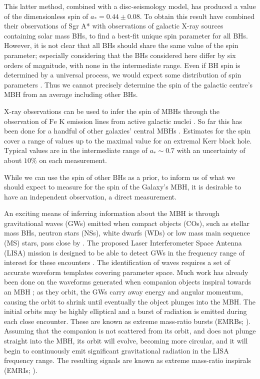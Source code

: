 \documentclass[useAMS,usedcolumn,usegraphicx,usenatbib]{mn2e}
\begin{document}
This latter method, combined with a disc-seismology model, has produced a value of the dimensionless spin of $a_\ast = 0.44 \pm 0.08$. To obtain this result \citet{Kato2010} have combined their observations of Sgr A* with observations of galactic X-ray sources containing solar mass BHs, to find a best-fit unique spin parameter for all BHs. However, it is not clear that all BHs should share the same value of the spin parameter; especially considering that the BHs considered here differ by six orders of magnitude, with none in the intermediate range. Even if BH spin is determined by a universal process, we would expect some distribution of spin parameters \citep{King2008, Berti2008}. Thus we cannot precisely determine the spin of the galactic centre's MBH from an average including other BHs.

X-ray observations can be used to infer the spin of MBHs through the observation of $\mathrm{Fe}$ $\mathrm{K}$ emission lines from active galactic nuclei \citep{Miller2007, McClintock2011}. So far this has been done for a handful of other galaxies' central MBHs \citep{Brenneman2006, Miniutti2009, Schmoll2009, delaCallePerez2010, Zoghbi2010, Nardini2011,  Patrick2011}. Estimates for the spin cover a range of values up to the maximal value for an extremal Kerr black hole. Typical values are in the intermediate range of $a_\ast \sim 0.7$ with an uncertainty of about $10\%$ on each measurement.

While we can use the spin of other BHs as a prior, to inform us of what we should expect to measure for the spin of the Galaxy's MBH, it is desirable to have an independent observation, a direct measurement.

An exciting means of inferring information about the MBH is through gravitational waves (GWs) emitted when compact objects (COs), such as stellar mass BHs, neutron stars (NSs), white dwarfs (WDs) or low mass main sequence (MS) stars, pass close by \citep{Sathyaprakash2009}. The proposed Laser Interferometer Space Antenna (LISA) mission is designed to be able to detect GWs in the frequency range of interest for these encounters \citep{Bender1998, Danzmann2003}. The identification of waves requires a set of accurate waveform templates covering parameter space. Much work has already been done on the waveforms generated when companion objects inspiral towards an MBH \citep{Glampedakis2005}; as they orbit, the GWs carry away energy and angular momentum, causing the orbit to shrink until eventually the object plunges into the MBH. The initial orbits may be highly elliptical and a burst of radiation is emitted during each close encounter. These are known as extreme mass-ratio bursts (EMRBs; \citealt{Rubbo2006}). Assuming that the companion is not scattered from its orbit, and does not plunge straight into the MBH, its orbit will evolve, becoming more circular, and it will begin to continuously emit significant gravitational radiation in the LISA frequency range. The resulting signals are known as extreme mass-ratio inspirals (EMRIs; \citealt{Amaro-Seoane2007}).
\end{document}

